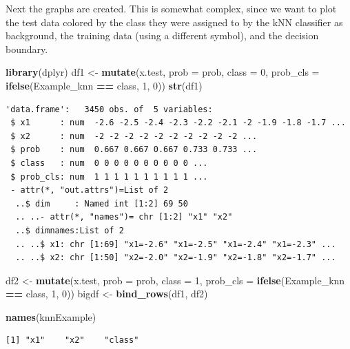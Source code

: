 \documentclass[
]{krantz}
\makeatletter
\newenvironment{Shaded}{\begin{snugshade}}{\end{snugshade}}
\newcommand{\DataTypeTok}[1]{\textcolor[rgb]{0.27,0.27,0.27}{#1}}
\newcommand{\DecValTok}[1]{\textcolor[rgb]{0.06,0.06,0.06}{#1}}
\newcommand{\KeywordTok}[1]{\textcolor[rgb]{0.27,0.27,0.27}{\textbf{#1}}}
\newcommand{\NormalTok}[1]{#1}
\newcommand{\OperatorTok}[1]{\textcolor[rgb]{0.43,0.43,0.43}{\textbf{#1}}}
\newcommand{\StringTok}[1]{\textcolor[rgb]{0.5,0.5,0.5}{#1}}
\newenvironment{kframe}{%
\medskip{}
\setlength{\fboxsep}{.8em}
 \def\at@end@of@kframe{}%
 \ifinner\ifhmode%
  \def\at@end@of@kframe{\end{minipage}}%
  \begin{minipage}{\columnwidth}%
 \fi\fi%
 \def\FrameCommand##1{\hskip\@totalleftmargin \hskip-\fboxsep
 \colorbox{shadecolor}{##1}\hskip-\fboxsep
     \hskip-\linewidth \hskip-\@totalleftmargin \hskip\columnwidth}%
 \MakeFramed {\advance\hsize-\width
   \@totalleftmargin\z@ \linewidth\hsize
   \@setminipage}}%
 {\par\unskip\endMakeFramed%
 \at@end@of@kframe}
\renewenvironment{Shaded}{\begin{kframe}}{\end{kframe}}
\makeatother
\begin{document}
Next the graphs are created. This is somewhat complex, since we want to plot the test data colored by the class they were assigned to by the kNN classifier as background, the training data (using a different symbol), and the decision boundary.

\begin{Shaded}
\begin{Highlighting}[]
\KeywordTok{library}\NormalTok{(dplyr)}
\NormalTok{df1 \textless{}{-}}\StringTok{ }\KeywordTok{mutate}\NormalTok{(x.test, }\DataTypeTok{prob =}\NormalTok{ prob, }\DataTypeTok{class =} \DecValTok{0}\NormalTok{,  }\DataTypeTok{prob\_cls =} \KeywordTok{ifelse}\NormalTok{(Example\_knn }\OperatorTok{==}\StringTok{ }\NormalTok{class, }\DecValTok{1}\NormalTok{, }\DecValTok{0}\NormalTok{))}
\KeywordTok{str}\NormalTok{(df1)}
\end{Highlighting}
\end{Shaded}

\begin{verbatim}
'data.frame':	3450 obs. of  5 variables:
 $ x1      : num  -2.6 -2.5 -2.4 -2.3 -2.2 -2.1 -2 -1.9 -1.8 -1.7 ...
 $ x2      : num  -2 -2 -2 -2 -2 -2 -2 -2 -2 -2 ...
 $ prob    : num  0.667 0.667 0.667 0.733 0.733 ...
 $ class   : num  0 0 0 0 0 0 0 0 0 0 ...
 $ prob_cls: num  1 1 1 1 1 1 1 1 1 1 ...
 - attr(*, "out.attrs")=List of 2
  ..$ dim     : Named int [1:2] 69 50
  .. ..- attr(*, "names")= chr [1:2] "x1" "x2"
  ..$ dimnames:List of 2
  .. ..$ x1: chr [1:69] "x1=-2.6" "x1=-2.5" "x1=-2.4" "x1=-2.3" ...
  .. ..$ x2: chr [1:50] "x2=-2.0" "x2=-1.9" "x2=-1.8" "x2=-1.7" ...
\end{verbatim}

\begin{Shaded}
\begin{Highlighting}[]
\NormalTok{df2 \textless{}{-}}\StringTok{ }\KeywordTok{mutate}\NormalTok{(x.test, }\DataTypeTok{prob =}\NormalTok{ prob, }\DataTypeTok{class =} \DecValTok{1}\NormalTok{,  }\DataTypeTok{prob\_cls =} \KeywordTok{ifelse}\NormalTok{(Example\_knn }\OperatorTok{==}\StringTok{ }\NormalTok{class, }\DecValTok{1}\NormalTok{, }\DecValTok{0}\NormalTok{))}
\NormalTok{bigdf \textless{}{-}}\StringTok{ }\KeywordTok{bind\_rows}\NormalTok{(df1, df2)}

\KeywordTok{names}\NormalTok{(knnExample)}
\end{Highlighting}
\end{Shaded}

\begin{verbatim}
[1] "x1"    "x2"    "class"
\end{verbatim}
\end{document}
